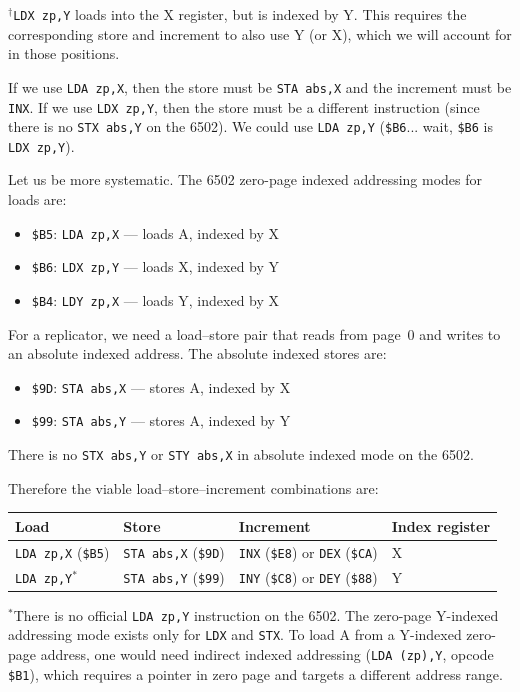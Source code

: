 \documentclass{article}
\newcommand{\hex}[1]{\texttt{\$#1}}
\newcommand{\opcode}[1]{\texttt{#1}}
\begin{document}
$^\dagger$\opcode{LDX zp,Y} loads into the X register, but is indexed
by Y. This requires the corresponding store and increment to also use Y
(or X), which we will account for in those positions.

If we use \opcode{LDA zp,X}, then the store must be \opcode{STA abs,X}
and the increment must be \opcode{INX}. If we use \opcode{LDX zp,Y},
then the store must be a different instruction (since there is no
\opcode{STX abs,Y} on the 6502). We could use
\opcode{LDA zp,Y} (\hex{B6}... wait, \hex{B6} is \opcode{LDX zp,Y}).

Let us be more systematic. The 6502 zero-page indexed addressing modes
for loads are:
\begin{itemize}
\item \hex{B5}: \opcode{LDA zp,X} --- loads A, indexed by X
\item \hex{B6}: \opcode{LDX zp,Y} --- loads X, indexed by Y
\item \hex{B4}: \opcode{LDY zp,X} --- loads Y, indexed by X
\end{itemize}

For a replicator, we need a load--store pair that reads from page~0 and
writes to an absolute indexed address. The absolute indexed stores are:
\begin{itemize}
\item \hex{9D}: \opcode{STA abs,X} --- stores A, indexed by X
\item \hex{99}: \opcode{STA abs,Y} --- stores A, indexed by Y
\end{itemize}
There is no \opcode{STX abs,Y} or \opcode{STY abs,X} in absolute
indexed mode on the 6502.

Therefore the viable load--store--increment combinations are:

\begin{center}
\begin{tabular}{llll}
\toprule
Load & Store & Increment & Index register \\
\midrule
\opcode{LDA zp,X} (\hex{B5}) & \opcode{STA abs,X} (\hex{9D}) & \opcode{INX} (\hex{E8}) or \opcode{DEX} (\hex{CA}) & X \\
\opcode{LDA zp,Y}$^*$ & \opcode{STA abs,Y} (\hex{99}) & \opcode{INY} (\hex{C8}) or \opcode{DEY} (\hex{88}) & Y \\
\bottomrule
\end{tabular}
\end{center}

$^*$There is no official \opcode{LDA zp,Y} instruction on the 6502.
The zero-page Y-indexed addressing mode exists only for \opcode{LDX}
and \opcode{STX}. To load A from a Y-indexed zero-page address, one
would need indirect indexed addressing (\opcode{LDA (zp),Y}, opcode
\hex{B1}), which requires a pointer in zero page and targets a
different address range.
\end{document}
